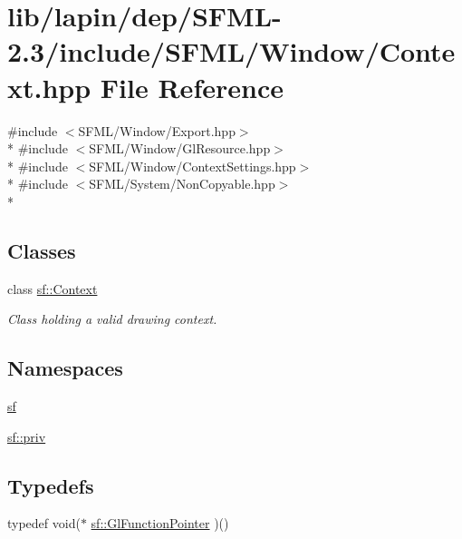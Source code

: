 \hypertarget{lapin_2dep_2_s_f_m_l-2_83_2include_2_s_f_m_l_2_window_2_context_8hpp}{\section{lib/lapin/dep/\-S\-F\-M\-L-\/2.3/include/\-S\-F\-M\-L/\-Window/\-Context.hpp File Reference}
\label{lapin_2dep_2_s_f_m_l-2_83_2include_2_s_f_m_l_2_window_2_context_8hpp}
}
{\ttfamily \#include $<$S\-F\-M\-L/\-Window/\-Export.\-hpp$>$}\\*
{\ttfamily \#include $<$S\-F\-M\-L/\-Window/\-Gl\-Resource.\-hpp$>$}\\*
{\ttfamily \#include $<$S\-F\-M\-L/\-Window/\-Context\-Settings.\-hpp$>$}\\*
{\ttfamily \#include $<$S\-F\-M\-L/\-System/\-Non\-Copyable.\-hpp$>$}\\*
\subsection*{Classes}
\begin{DoxyCompactItemize}
\item 
class \hyperlink{classsf_1_1_context}{sf\-::\-Context}
\begin{DoxyCompactList}\small\item\em Class holding a valid drawing context. \end{DoxyCompactList}\end{DoxyCompactItemize}
\subsection*{Namespaces}
\begin{DoxyCompactItemize}
\item 
\hyperlink{namespacesf}{sf}
\item 
\hyperlink{namespacesf_1_1priv}{sf\-::priv}
\end{DoxyCompactItemize}
\subsection*{Typedefs}
\begin{DoxyCompactItemize}
\item 
typedef void($\ast$ \hyperlink{namespacesf_ad4f831952db30b6fd35330c7af581737}{sf\-::\-Gl\-Function\-Pointer} )()
\end{DoxyCompactItemize}
